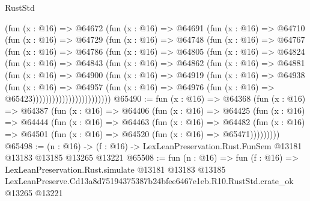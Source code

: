 \begin{lexlean}{RustStd}
\begin{coremodule}
                (fun (x : @16) =>
                @64672
                  (fun (x : @16) =>
                  @64691
                    (fun (x : @16) =>
                    @64710
                      (fun (x : @16) =>
                      @64729
                        (fun (x : @16) =>
                        @64748
                          (fun (x : @16) =>
                          @64767
                            (fun (x : @16) =>
                            @64786
                              (fun (x : @16) =>
                              @64805
                                (fun (x : @16) =>
                                @64824
                                  (fun (x : @16) =>
                                  @64843
                                    (fun (x : @16) =>
                                    @64862
                                      (fun (x : @16) =>
                                      @64881
                                        (fun (x : @16) =>
                                        @64900
                                          (fun (x : @16) =>
                                          @64919
                                            (fun (x : @16) =>
                                            @64938
                                              (fun (x : @16) =>
                                              @64957
                                                (fun (x : @16) =>
                                                @64976
                                                  (fun (x : @16) => @65423))))))))))))))))))))))))
@65490 := fun (x : @16) =>
  @64368
    (fun (x : @16) =>
    @64387
      (fun (x : @16) =>
      @64406
        (fun (x : @16) =>
        @64425
          (fun (x : @16) =>
          @64444
            (fun (x : @16) =>
            @64463
              (fun (x : @16) =>
              @64482
                (fun (x : @16) => @64501 (fun (x : @16) => @64520 (fun (x : @16) => @65471)))))))))
@65498 := (n : @16) ->
  (f : @16) -> LexLeanPreservation.Rust.FunSem @13181 @13183 @13185 @13265 @13221
@65508 := fun (n : @16) =>
  fun (f : @16) =>
  LexLeanPreservation.Rust.simulate
    @13181
    @13183
    @13185
    LexLeanPreserve.Cd13a8d75194375387b24bfee6467e1eb.R10.RustStd.crate_ok
    @13265
    @13221
\end{coremodule}
\end{lexlean}
